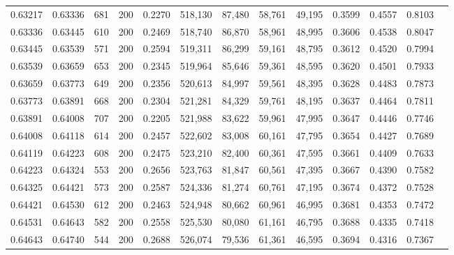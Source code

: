 \begin{tabular}{rrrrrrrrrrrrr}
0.63217 & 0.63336 &    681 & 200 &                                     0.2270 & 518,130 &  87,480 &  58,761 &  49,195 & 0.3599 & 0.4557 & 0.8103 \\
0.63336 & 0.63445 &    610 & 200 &                                     0.2469 & 518,740 &  86,870 &  58,961 &  48,995 & 0.3606 & 0.4538 & 0.8047 \\
0.63445 & 0.63539 &    571 & 200 &                                     0.2594 & 519,311 &  86,299 &  59,161 &  48,795 & 0.3612 & 0.4520 & 0.7994 \\
0.63539 & 0.63659 &    653 & 200 &                                     0.2345 & 519,964 &  85,646 &  59,361 &  48,595 & 0.3620 & 0.4501 & 0.7933 \\
0.63659 & 0.63773 &    649 & 200 &                                     0.2356 & 520,613 &  84,997 &  59,561 &  48,395 & 0.3628 & 0.4483 & 0.7873 \\
0.63773 & 0.63891 &    668 & 200 &                                     0.2304 & 521,281 &  84,329 &  59,761 &  48,195 & 0.3637 & 0.4464 & 0.7811 \\
0.63891 & 0.64008 &    707 & 200 &                                     0.2205 & 521,988 &  83,622 &  59,961 &  47,995 & 0.3647 & 0.4446 & 0.7746 \\
0.64008 & 0.64118 &    614 & 200 &                                     0.2457 & 522,602 &  83,008 &  60,161 &  47,795 & 0.3654 & 0.4427 & 0.7689 \\
0.64119 & 0.64223 &    608 & 200 &                                     0.2475 & 523,210 &  82,400 &  60,361 &  47,595 & 0.3661 & 0.4409 & 0.7633 \\
0.64223 & 0.64324 &    553 & 200 &                                     0.2656 & 523,763 &  81,847 &  60,561 &  47,395 & 0.3667 & 0.4390 & 0.7582 \\
0.64325 & 0.64421 &    573 & 200 &                                     0.2587 & 524,336 &  81,274 &  60,761 &  47,195 & 0.3674 & 0.4372 & 0.7528 \\
0.64421 & 0.64530 &    612 & 200 &                                     0.2463 & 524,948 &  80,662 &  60,961 &  46,995 & 0.3681 & 0.4353 & 0.7472 \\
0.64531 & 0.64643 &    582 & 200 &                                     0.2558 & 525,530 &  80,080 &  61,161 &  46,795 & 0.3688 & 0.4335 & 0.7418 \\
0.64643 & 0.64740 &    544 & 200 &                                     0.2688 & 526,074 &  79,536 &  61,361 &  46,595 & 0.3694 & 0.4316 & 0.7367 \\

\end{tabular}

